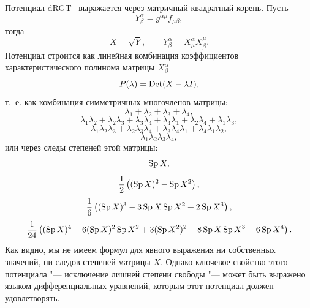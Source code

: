 Потенциал dRGT~\cite{dRGT-1, dRGT-2} выражается через матричный квадратный корень. Пусть
$$
Y^\alpha_\beta=g^{\alpha\mu}f_{\mu\beta},
$$
тогда
$$
X=\sqrt{Y},\qquad Y^\alpha_\beta=X^\alpha_\mu X^\mu_\beta.
$$
Потенциал строится как линейная комбинация коэффициентов характеристического полинома матрицы $X^\alpha_\beta$
$$
P(\lambda)= \mathop{\rm Det}(X-\lambda I),
$$
т.~е. как комбинация симметричных многочленов матрицы:
$$
\lambda_1+\lambda_2+\lambda_3+\lambda_4,
$$ 
$$
\lambda_1 \lambda_2+\lambda_2 \lambda_3+\lambda_3 \lambda_4+\lambda_4 \lambda_1 +\lambda_2\lambda_4+\lambda_1\lambda_3,
$$
$$
\lambda_1\lambda_2\lambda_3+\lambda_2\lambda_3\lambda_4+\lambda_3\lambda_4\lambda_1+\lambda_4\lambda_1\lambda_2,
$$
$$
\lambda_1\lambda_2\lambda_3\lambda_4,
$$
или через следы степеней этой матрицы:
$$
\mathop{\rm Sp} X,
$$
$$
\frac{1}{2}\left((\mathop{\rm Sp} X)^2- \mathop{\rm Sp} X^2\right),
$$
$$
\frac{1}{6}\left((\mathop{\rm Sp} X)^3-3 \mathop{\rm Sp} X \mathop{\rm Sp} X^2+2 \mathop{\rm Sp} X^3
\right),
$$
$$
\frac{1}{24}\left( (\mathop{\rm Sp} X)^4 -6 (\mathop{\rm Sp} X)^2 \mathop{\rm Sp} X^2 +3(\mathop{\rm Sp} X^2)^2 +8 \mathop{\rm Sp} X \mathop{\rm Sp} X^3 -6 \mathop{\rm Sp} X^4
\right).
$$
Как видно, мы не имеем формул для явного выражения ни собственных значений, ни следов степеней матрицы $X$. 
Однако ключевое свойство этого потенциала "--- исключение лишней степени свободы "--- может быть выражено языком дифференциальных уравнений, которым этот потенциал должен удовлетворять.  

\smallskip

